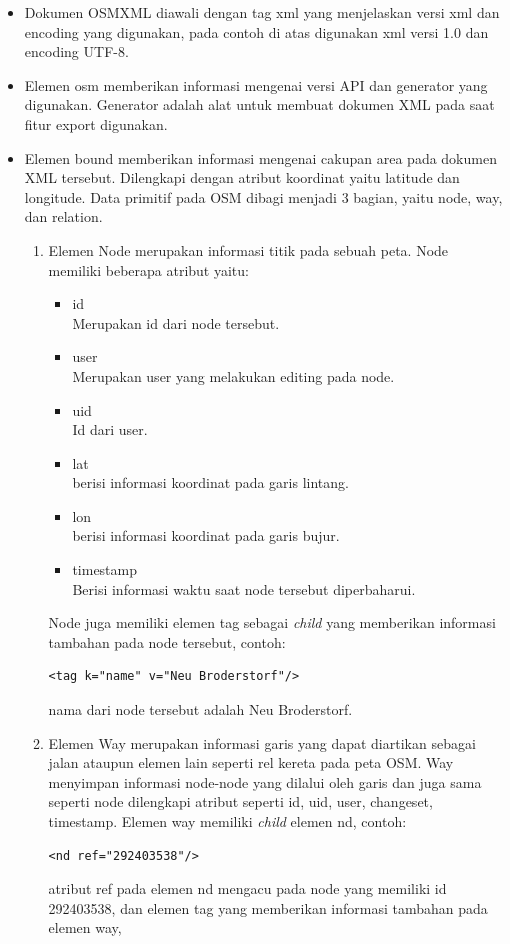 \begin{itemize}
\item Dokumen OSMXML diawali dengan tag xml yang menjelaskan versi xml dan
encoding yang digunakan, pada contoh di atas digunakan xml versi 1.0 dan
encoding UTF-8.

\item Elemen osm memberikan informasi mengenai versi API dan generator yang
digunakan. Generator adalah alat untuk membuat dokumen XML pada saat fitur
export digunakan. 

\item Elemen bound memberikan informasi mengenai cakupan area pada dokumen XML
tersebut. Dilengkapi dengan atribut koordinat yaitu latitude dan longitude.
Data primitif pada OSM dibagi menjadi 3 bagian, yaitu node, way, dan relation.
\begin{enumerate}
\item Elemen Node merupakan informasi titik pada sebuah peta. Node memiliki
beberapa atribut yaitu:
\begin{itemize}
\item id \\
Merupakan id dari node tersebut.

\item user \\ 
Merupakan user yang melakukan editing pada node.

\item uid \\
Id dari user.

\item lat \\
berisi informasi koordinat pada garis lintang.

\item lon \\
berisi informasi koordinat pada garis bujur.

\item timestamp \\
Berisi informasi waktu saat node tersebut diperbaharui.
\end{itemize}
Node juga memiliki elemen tag sebagai \textit{child} yang memberikan informasi
tambahan pada node tersebut, contoh:
\begin{verbatim}
<tag k="name" v="Neu Broderstorf"/>
\end{verbatim}
nama dari node tersebut adalah Neu Broderstorf.

\item Elemen Way merupakan informasi garis yang dapat diartikan sebagai jalan
ataupun elemen lain seperti rel kereta pada peta OSM. Way menyimpan informasi
node-node yang dilalui oleh garis dan juga sama seperti node dilengkapi atribut seperti id, uid, user, changeset,
timestamp. Elemen way memiliki \textit{child} elemen nd, contoh:  
\begin{verbatim}
<nd ref="292403538"/>
\end{verbatim}
atribut ref pada elemen nd mengacu pada node yang memiliki id 292403538, dan
elemen tag yang memberikan informasi tambahan pada elemen way,


\end{enumerate}
\end{itemize}
